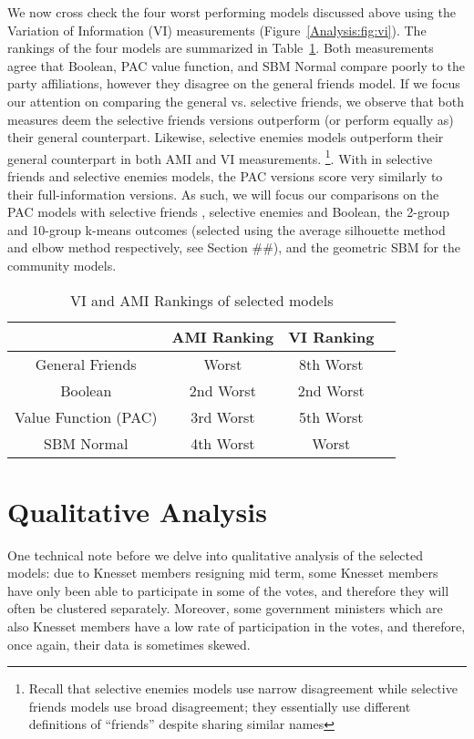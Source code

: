 We now cross check the four worst performing models discussed above using the
Variation of Information (VI) measurements (Figure~\ref{Analysis:fig:vi}).
The rankings of the four models are summarized in
Table~\ref{Analysis:table:ami_vi_worst_rankings}.
Both measurements agree that Boolean, PAC value function, and SBM Normal compare poorly
to the party affiliations, however they disagree on the general friends
model.
If we focus our attention on comparing the general vs. selective friends, we
observe that both measures deem the selective friends versions outperform
(or perform equally as) their general counterpart.
Likewise, selective enemies models outperform their general counterpart in
both AMI and VI measurements. \footnote{Recall that selective enemies models
use narrow disagreement while selective friends models use broad disagreement;
they essentially use different definitions of ``friends'' despite sharing
similar names}.
With in selective friends and selective enemies models, the PAC versions
score very similarly to their full-information versions.
As such, we will focus our comparisons on the PAC models with selective friends
, selective enemies and Boolean, the 2-group and 10-group k-means outcomes
(selected using the average silhouette method and elbow method respectively, see Section \#\#),
and the geometric SBM for the community models.

\begin{table}[h!]
\centering
\begin{tabular}{|c|c|c|c|}
\hline
       & AMI Ranking & VI Ranking \\ \hline
General Friends & Worst & 8th Worst \\
Boolean & 2nd Worst & 2nd Worst \\
Value Function (PAC) & 3rd Worst & 5th Worst \\
SBM Normal & 4th Worst & Worst \\
\hline
\end{tabular}
\caption{VI and AMI Rankings of selected models}
\label{Analysis:table:ami_vi_worst_rankings}
\end{table}


\section{Qualitative Analysis}
\label{sec:qualitative_analysis}

One technical note before we delve into qualitative analysis of the selected
models: due to Knesset members resigning mid term, some Knesset members have
only been able to participate in some of the votes, and therefore they will
often be clustered separately.
Moreover, some government ministers which are also Knesset members have a low
rate of participation in the votes, and therefore, once again, their data is
sometimes skewed.

